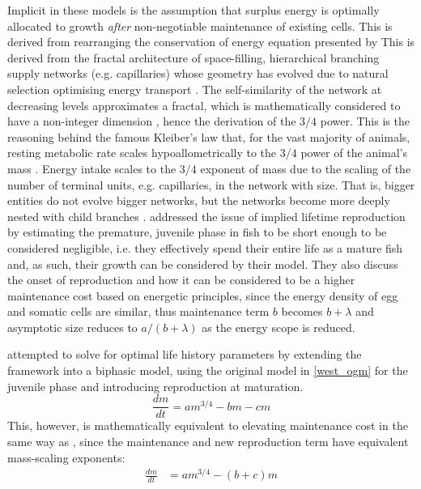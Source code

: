 \documentclass[a4paper]{article} %
\begin{document}
Implicit in these models is the assumption that surplus energy is optimally allocated to growth \textit{after} non-negotiable maintenance of existing cells. This is derived from rearranging the conservation of energy equation presented by \cite{West2001}
This is derived from the fractal architecture of space-filling, hierarchical branching supply networks (e.g. capillaries) whose geometry has evolved due to natural selection optimising energy transport \autocite{West1997, West2005}. The self-similarity of the network at decreasing levels approximates a fractal, which is mathematically considered to have a non-integer dimension \autocite{Hausdorff1918, Mandelbrot1982}, hence the derivation of the $3/4$ power. This is the reasoning behind the famous Kleiber's law that, for the vast majority of animals, resting metabolic rate scales hypoallometrically to the $3/4$ power of the animal's mass \autocite{Kleiber1947, peters1983, niklas1994plant}. 
Energy intake scales to the $3/4$ exponent of mass due to the scaling of the number of terminal units, e.g. capillaries, in the network with size. That is, bigger entities do not evolve bigger networks, but the networks become more deeply nested with child branches \autocite{West1997}. 
\cite{West2001} addressed the issue of implied lifetime reproduction by estimating the premature, juvenile phase in fish to be short enough to be considered negligible, i.e. they effectively spend their entire life as a mature fish and, as such, their growth can be considered by their model. They also discuss the onset of reproduction and how it can be considered to be a higher maintenance cost based on energetic principles, since the energy density of egg and somatic cells are similar, thus maintenance term $b$ becomes $b + \lambda$ and asymptotic size reduces to $a/(b+\lambda)$ as the energy scope is reduced.

\cite{Charnov2001} attempted to solve for optimal life history parameters by extending the \cite{West2001} framework into a biphasic model, using the original model in \eqref{west_ogm} for the juvenile phase and introducing reproduction at maturation.
        \begin{equation}
            \frac{dm}{dt} = am^{3/4} - bm - cm \label{charnov_ogm}
        \end{equation}
        This, however, is mathematically equivalent to elevating maintenance cost in the same way as \cite{West2001}, since the maintenance and new reproduction term have equivalent mass-scaling exponents:
        \begin{align*}
            \frac{dm}{dt} &= am^{3/4} - (b+c)m
        \end{align*}
\end{document}
